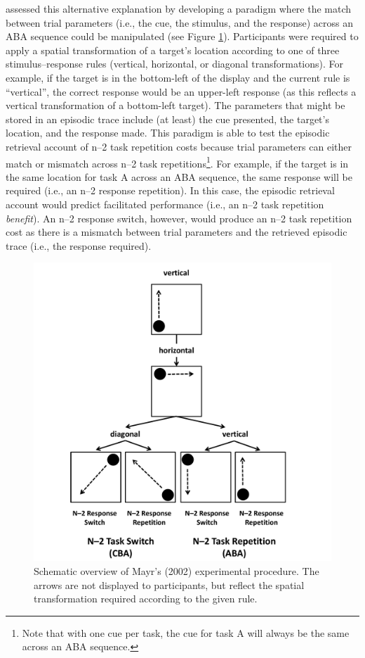 \documentclass[a4paper, doc, natbib]{apa6}
\begin{document}
\cite{Mayr2002} assessed this alternative explanation by developing a paradigm where the match between trial parameters (i.e., the cue, the stimulus, and the response) across an ABA sequence could be manipulated (see Figure \ref{fig:mayrExperiment}). Participants were required to apply a spatial transformation of a target's location according to one of three stimulus--response rules (vertical, horizontal, or diagonal transformations). For example, if the target is in the bottom-left of the display and the current rule is ``vertical'', the correct response would be an upper-left response (as this reflects a vertical transformation of a bottom-left target). The parameters that might be stored in an episodic trace include (at least) the cue presented, the target's location, and the response made. This paradigm is able to test the episodic retrieval account of n--2 task repetition costs because trial parameters can either match or mismatch across n--2 task repetitions\footnote{Note that with one cue per task, the cue for task A will always be the same across an ABA sequence.}. For example, if the target is in the same location for task A across an ABA sequence, the same response will be required (i.e., an n--2 response repetition). In this case, the episodic retrieval account would predict facilitated performance (i.e., an n--2 task repetition \emph{benefit}). An n--2 response switch, however, would produce an n--2 task repetition cost as there is a mismatch between trial parameters and the retrieved episodic trace (i.e., the response required).

\begin{figure}
\begin{center}
\includegraphics[width = \textwidth]{Images/mayrExperiment.pdf}
\caption{Schematic overview of Mayr's (2002) experimental procedure. The arrows are not displayed to participants, but reflect the spatial transformation required according to the given rule. }
\label{fig:mayrExperiment}
\end{center}
\end{figure}
\end{document}
